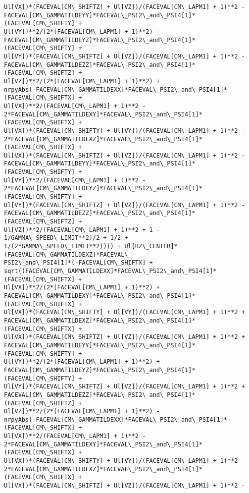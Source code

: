 \documentclass[landscape,letterpaper,10pt,english]{article}
\begin{document}
\begin{Verbatim}[commandchars=\\\{\}]
Ul[VX])*(FACEVAL[CM\_SHIFTZ] + Ul[VZ])/(FACEVAL[CM\_LAPM1] + 1)**2 -
FACEVAL[CM\_GAMMATILDEYY]*FACEVAL\_PSI2\_and\_PSI4[1]*(FACEVAL[CM\_SHIFTY] +
Ul[VY])**2/(2*(FACEVAL[CM\_LAPM1] + 1)**2) -
FACEVAL[CM\_GAMMATILDEYZ]*FACEVAL\_PSI2\_and\_PSI4[1]*(FACEVAL[CM\_SHIFTY] +
Ul[VY])*(FACEVAL[CM\_SHIFTZ] + Ul[VZ])/(FACEVAL[CM\_LAPM1] + 1)**2 -
FACEVAL[CM\_GAMMATILDEZZ]*FACEVAL\_PSI2\_and\_PSI4[1]*(FACEVAL[CM\_SHIFTZ] +
Ul[VZ])**2/(2*(FACEVAL[CM\_LAPM1] + 1)**2) +
nrpyAbs(-FACEVAL[CM\_GAMMATILDEXX]*FACEVAL\_PSI2\_and\_PSI4[1]*(FACEVAL[CM\_SHIFTX] +
Ul[VX])**2/(FACEVAL[CM\_LAPM1] + 1)**2 -
2*FACEVAL[CM\_GAMMATILDEXY]*FACEVAL\_PSI2\_and\_PSI4[1]*(FACEVAL[CM\_SHIFTX] +
Ul[VX])*(FACEVAL[CM\_SHIFTY] + Ul[VY])/(FACEVAL[CM\_LAPM1] + 1)**2 -
2*FACEVAL[CM\_GAMMATILDEXZ]*FACEVAL\_PSI2\_and\_PSI4[1]*(FACEVAL[CM\_SHIFTX] +
Ul[VX])*(FACEVAL[CM\_SHIFTZ] + Ul[VZ])/(FACEVAL[CM\_LAPM1] + 1)**2 -
FACEVAL[CM\_GAMMATILDEYY]*FACEVAL\_PSI2\_and\_PSI4[1]*(FACEVAL[CM\_SHIFTY] +
Ul[VY])**2/(FACEVAL[CM\_LAPM1] + 1)**2 -
2*FACEVAL[CM\_GAMMATILDEYZ]*FACEVAL\_PSI2\_and\_PSI4[1]*(FACEVAL[CM\_SHIFTY] +
Ul[VY])*(FACEVAL[CM\_SHIFTZ] + Ul[VZ])/(FACEVAL[CM\_LAPM1] + 1)**2 -
FACEVAL[CM\_GAMMATILDEZZ]*FACEVAL\_PSI2\_and\_PSI4[1]*(FACEVAL[CM\_SHIFTZ] +
Ul[VZ])**2/(FACEVAL[CM\_LAPM1] + 1)**2 + 1 - 1/GAMMA\_SPEED\_LIMIT**2)/2 + 1/2 +
1/(2*GAMMA\_SPEED\_LIMIT**2)))) + Ul[BZ\_CENTER]*(FACEVAL[CM\_GAMMATILDEXZ]*FACEVAL\_
PSI2\_and\_PSI4[1]*(-FACEVAL[CM\_SHIFTX] +
sqrt((FACEVAL[CM\_GAMMATILDEXX]*FACEVAL\_PSI2\_and\_PSI4[1]*(FACEVAL[CM\_SHIFTX] +
Ul[VX])**2/(2*(FACEVAL[CM\_LAPM1] + 1)**2) +
FACEVAL[CM\_GAMMATILDEXY]*FACEVAL\_PSI2\_and\_PSI4[1]*(FACEVAL[CM\_SHIFTX] +
Ul[VX])*(FACEVAL[CM\_SHIFTY] + Ul[VY])/(FACEVAL[CM\_LAPM1] + 1)**2 +
FACEVAL[CM\_GAMMATILDEXZ]*FACEVAL\_PSI2\_and\_PSI4[1]*(FACEVAL[CM\_SHIFTX] +
Ul[VX])*(FACEVAL[CM\_SHIFTZ] + Ul[VZ])/(FACEVAL[CM\_LAPM1] + 1)**2 +
FACEVAL[CM\_GAMMATILDEYY]*FACEVAL\_PSI2\_and\_PSI4[1]*(FACEVAL[CM\_SHIFTY] +
Ul[VY])**2/(2*(FACEVAL[CM\_LAPM1] + 1)**2) +
FACEVAL[CM\_GAMMATILDEYZ]*FACEVAL\_PSI2\_and\_PSI4[1]*(FACEVAL[CM\_SHIFTY] +
Ul[VY])*(FACEVAL[CM\_SHIFTZ] + Ul[VZ])/(FACEVAL[CM\_LAPM1] + 1)**2 +
FACEVAL[CM\_GAMMATILDEZZ]*FACEVAL\_PSI2\_and\_PSI4[1]*(FACEVAL[CM\_SHIFTZ] +
Ul[VZ])**2/(2*(FACEVAL[CM\_LAPM1] + 1)**2) -
nrpyAbs(-FACEVAL[CM\_GAMMATILDEXX]*FACEVAL\_PSI2\_and\_PSI4[1]*(FACEVAL[CM\_SHIFTX] +
Ul[VX])**2/(FACEVAL[CM\_LAPM1] + 1)**2 -
2*FACEVAL[CM\_GAMMATILDEXY]*FACEVAL\_PSI2\_and\_PSI4[1]*(FACEVAL[CM\_SHIFTX] +
Ul[VX])*(FACEVAL[CM\_SHIFTY] + Ul[VY])/(FACEVAL[CM\_LAPM1] + 1)**2 -
2*FACEVAL[CM\_GAMMATILDEXZ]*FACEVAL\_PSI2\_and\_PSI4[1]*(FACEVAL[CM\_SHIFTX] +
Ul[VX])*(FACEVAL[CM\_SHIFTZ] + Ul[VZ])/(FACEVAL[CM\_LAPM1] + 1)**2 -

\end{Verbatim}
\end{document}

